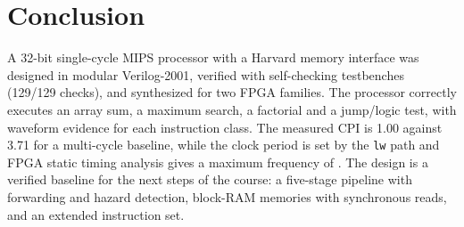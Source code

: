 \documentclass[conference]{IEEEtran}
\begin{document}
\section{Conclusion}
A 32-bit single-cycle MIPS processor with a Harvard memory interface was
designed in modular Verilog-2001, verified with self-checking testbenches
(129/129 checks), and synthesized for two FPGA families. The processor
correctly executes an array sum, a maximum search, a factorial and a jump/logic
test, with waveform evidence for each instruction class. The measured CPI is
1.00 against 3.71 for a multi-cycle baseline, while the clock period is set by
the \texttt{lw} path and FPGA static timing analysis gives a maximum frequency of
\fmaxvalue. The design is a verified baseline for the next steps of the
course: a five-stage pipeline with forwarding and hazard detection, block-RAM
memories with synchronous reads, and an extended instruction set.

\FloatBarrier


\end{document}
